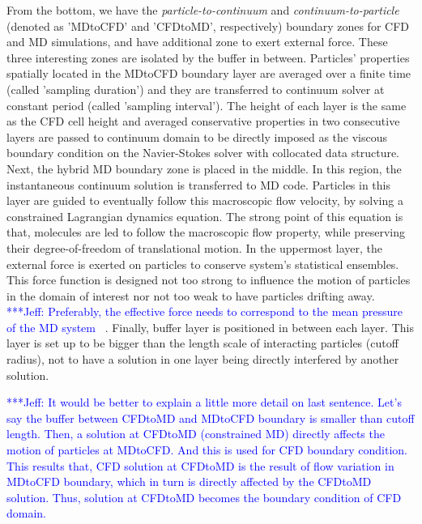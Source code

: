 \documentclass[preprint,12pt]{elsarticle}
\newcommand{\skonote}[1]{ {\textcolor{blue} { ***Jeff: #1 }}}
\newcommand{\skonote}[1]{}
\begin{document}
From the bottom, we have the {\it{particle-to-continuum}} and {\it{continuum-to-particle}} (denoted as 'MDtoCFD' and 'CFDtoMD', respectively) boundary zones for CFD and MD simulations, and have additional zone to exert external force. These three interesting zones are isolated by the buffer in between.
Particles' properties spatially located in the MDtoCFD boundary layer are averaged over a finite time (called 'sampling duration') and they are transferred to continuum solver at constant period (called 'sampling interval'). The height of each layer is the same as the CFD cell height and averaged conservative properties in two consecutive layers are passed to continuum domain to be directly imposed as the viscous boundary condition on the Navier-Stokes solver with collocated data structure.
Next, the hybrid MD boundary zone is placed in the middle. In this region, the instantaneous continuum solution is transferred to MD code. Particles in this layer are guided to eventually follow this macroscopic flow velocity, by solving a constrained Lagrangian dynamics equation. The strong point of this equation is that, molecules are led to follow the macroscopic flow property, while preserving their degree-of-freedom of translational motion.
In the uppermost layer, the external force is exerted on particles to conserve system's statistical ensembles. This force function is designed not too strong to influence the motion of particles in the domain of interest nor not too weak to have particles drifting away. \skonote{Preferably, the effective force needs to correspond to the mean pressure of the MD system~\cite{Werder}}. Finally, buffer layer is positioned in between each layer. This layer is set up to be bigger than the length scale of interacting particles (cutoff radius), not to have a solution in one layer being directly interfered by another solution.


\skonote{It would be better to explain a little more detail on last sentence. Let's say the buffer between CFDtoMD and MDtoCFD boundary is smaller than cutoff length. Then, a solution at CFDtoMD (constrained MD) directly affects the motion of particles at MDtoCFD. And this is used for CFD boundary condition. This results that, CFD solution at CFDtoMD is the result of flow variation in MDtoCFD boundary, which in turn is directly affected by the CFDtoMD solution. Thus, solution at CFDtoMD becomes the boundary condition of CFD domain.}
\end{document}
